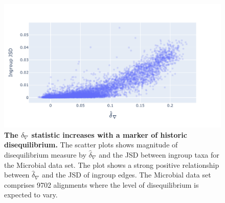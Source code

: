 \begin{figure}[htbp]
\centering
\includegraphics[width=\textwidth]{figures/plots/microbial/d-conv-JSD.pdf}
\caption{\textbf{The $\hat\delta_\nabla$ statistic increases with a marker of historic disequilibrium.} The scatter plots shows magnitude of disequilibrium measure by $\hat\delta_\nabla$ and the JSD between ingroup taxa for the Microbial data set. The plot shows a strong positive relationship between $\hat\delta_\nabla$ and the JSD of ingroup edges. The Microbial data set comprises 9702 alignments where the level of disequilibrium is expected to vary.}
\label{fig:microbial/d-conv/JSD}
\end{figure}